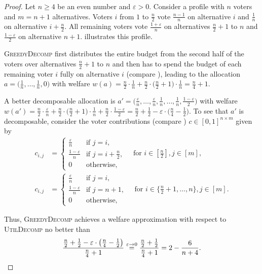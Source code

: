 \documentclass[11pt]{article}
\newcommand{\GrdDec}{\textsc{GreedyDecomp} }
\newcommand{\UtDec}{\textsc{UtilDecomp} }
\begin{document}
\begin{proof}
    Let $n\geq 4$ be an even number and $\varepsilon > 0$.
    Consider a profile with $n$ voters and $m=n+1$ alternatives. Voters $i$ from $1$ to $\frac{n}{2}$ vote $\frac{n-1}{n}$ on alternative $i$ and $\frac{1}{n}$ on alternative $i+\frac{n}{2}$. All remaining voters vote $\frac{1+\varepsilon}{n}$ on alternatives $\frac{n}{2}+1$ to $n$ and $\frac{1-\varepsilon}{2}$ on alternative $n+1$.  illustrates this profile.

    \GrdDec first distributes the entire budget from the second half of the voters over alternatives $\frac{n}{2}+1$ to $n$ and then has to spend the budget of each remaining voter $i$ fully on alternative $i$ (compare ), leading to the allocation $a = \big(\frac{1}{n}, \dots, \frac{1}{n}, 0\big)$ with welfare $w(a) = \frac{n}{2} \cdot \frac{1}{n} + \frac{n}{2} \cdot \big(\frac{n}{2} + 1\big) \cdot \frac{1}{n} = \frac{n}{4} + 1$.

    A better decomposable allocation is $a' = \big(\frac{\varepsilon}{n}, \dots, \frac{\varepsilon}{n}, \frac{1}{n}, \dots, \frac{1}{n}, \frac{1-\varepsilon}{2}\big)$ with welfare $w(a') = \frac{n}{2} \cdot \frac{\varepsilon}{n} + \frac{n}{2} \cdot \big(\frac{n}{2} + 1\big) \cdot \frac{1}{n} + \frac{n}{2} \cdot \frac{1-\varepsilon}{2} = \frac{n}{2} + \frac{1}{2} - \varepsilon \cdot \big(\frac{n}{4} - \frac{1}{2}\big)$. 
    To see that $a'$ is decomposable, consider the voter contributions (compare ) $c\in [0,1]^{n\times m}$ given by 
    \begin{align*}
        c_{i,j} & = \begin{cases} \frac{\varepsilon}{n} & \text{if } j=i,\\
        \frac{1-\varepsilon}{n} & \text{if } j=i+\frac{n}{2},\\
        0 & \text{otherwise,}\end{cases} \quad \text{for } i \in \textstyle [\frac{n}{2}], j\in [m],\\ 
        c_{i,j} & =  \begin{cases} \frac{\varepsilon}{n} & \text{if } j=i,\\
        \frac{1-\varepsilon}{n} & \text{if } j=n+1,\\
        0 & \text{otherwise,}\end{cases} \quad \text{for } i\in \textstyle \{\frac{n}{2}+1,\ldots,n\}, j\in [m].
    \end{align*}
    
    Thus, \GrdDec achieves a welfare approximation with respect to \UtDec no better than 
    \[
        \frac{\frac{n}{2} + \frac{1}{2} - \varepsilon \cdot \big(\frac{n}{4} - \frac{1}{2}\big)}{\frac{n}{4} + 1} \stackrel{\varepsilon \rightarrow 0}{=} \frac{\frac{n}{2} + \frac{1}{2}}{\frac{n}{4} + 1} = 2 - \frac{6}{n+4}.\qedhere
    \]
\end{proof}
\end{document}
